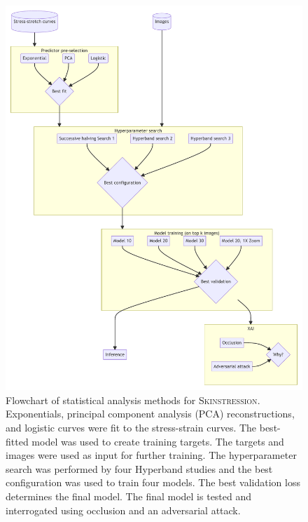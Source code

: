 \begin{figure}[p]
    \centering
    \includegraphics{mermaid/skin_analysis.pdf}
    \caption[Flowchart of statistical analysis methods for \textsc{Skinstression}]{
        Flowchart of statistical analysis methods for \textsc{Skinstression}.
        Exponentials, principal component analysis (PCA) reconstructions, and logistic curves were fit to the stress-strain curves.
        The best-fitted model was used to create training targets.
        The targets and images were used as input for further training.
        The hyperparameter search was performed by four Hyperband studies and the best configuration was used to train four models.
        The best validation loss determines the final model.
        The final model is tested and interrogated using occlusion and an adversarial attack.
    }
    \label{fig:skin_stat_methods}
\end{figure}

